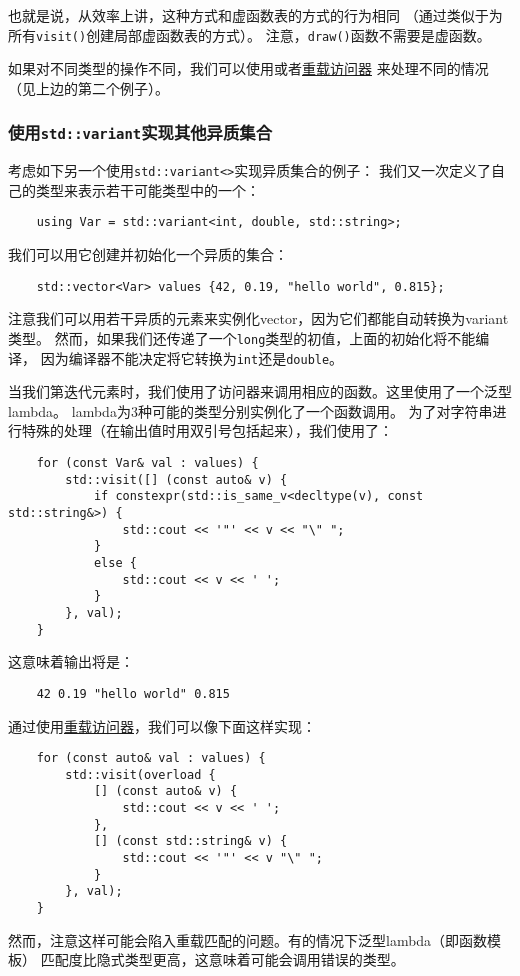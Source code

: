 也就是说，从效率上讲，这种方式和虚函数表的方式的行为相同
（通过类似于为所有\texttt{visit()}创建局部虚函数表的方式）。
注意，\texttt{draw()}函数不需要是虚函数。

如果对不同类型的操作不同，我们可以使用或者\hyperref[ch16.3.3.4]{重载访问器}
来处理不同的情况（见上边的第二个例子）。

\subsubsection{使用\texttt{std::variant}实现其他异质集合}
考虑如下另一个使用\texttt{std::variant<>}实现异质集合的例子：
我们又一次定义了自己的类型来表示若干可能类型中的一个：
\begin{lstlisting}
    using Var = std::variant<int, double, std::string>;
\end{lstlisting}
我们可以用它创建并初始化一个异质的集合：
\begin{lstlisting}
    std::vector<Var> values {42, 0.19, "hello world", 0.815};
\end{lstlisting}
注意我们可以用若干异质的元素来实例化vector，因为它们都能自动转换为variant类型。
然而，如果我们还传递了一个\texttt{long}类型的初值，上面的初始化将不能编译，
因为编译器不能决定将它转换为\texttt{int}还是\texttt{double}。

当我们第迭代元素时，我们使用了访问器来调用相应的函数。这里使用了一个泛型lambda。
lambda为3种可能的类型分别实例化了一个函数调用。
为了对字符串进行特殊的处理（在输出值时用双引号包括起来），我们使用了：
\begin{lstlisting}
    for (const Var& val : values) {
        std::visit([] (const auto& v) {
            if constexpr(std::is_same_v<decltype(v), const std::string&>) {
                std::cout << '"' << v << "\" ";
            }
            else {
                std::cout << v << ' ';
            }
        }, val);
    }
\end{lstlisting}
这意味着输出将是：
\begin{lstlisting}
    42 0.19 "hello world" 0.815
\end{lstlisting}
通过使用\hyperref[ch16.3.3.4]{重载访问器}，我们可以像下面这样实现：
\begin{lstlisting}
    for (const auto& val : values) {
        std::visit(overload {
            [] (const auto& v) {
                std::cout << v << ' ';
            },
            [] (const std::string& v) {
                std::cout << '"' << v "\" ";
            }
        }, val);
    }
\end{lstlisting}
然而，注意这样可能会陷入重载匹配的问题。有的情况下泛型lambda（即函数模板）
匹配度比隐式类型更高，这意味着可能会调用错误的类型。

